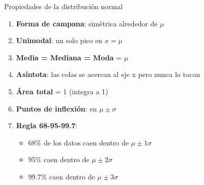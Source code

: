 \documentclass[aspectratio=169, 11pt]{beamer}
\begin{document}
\begin{frame}{Propiedades de la distribución normal}
\begin{enumerate}
\item \textbf{Forma de campana}: simétrica alrededor de $\mu$
\item \textbf{Unimodal}: un solo pico en $x = \mu$
\item \textbf{Media = Mediana = Moda} = $\mu$
\item \textbf{Asíntota}: las colas se acercan al eje x pero nunca lo tocan
\item \textbf{Área total} = 1 (integra a 1)
\item \textbf{Puntos de inflexión}: en $\mu \pm \sigma$
\item \textbf{Regla 68-95-99.7}:
  \begin{itemize}
  \item 68\% de los datos caen dentro de $\mu \pm 1\sigma$
  \item 95\% caen dentro de $\mu \pm 2\sigma$
  \item 99.7\% caen dentro de $\mu \pm 3\sigma$
  \end{itemize}
\end{enumerate}

\vspace{0.5em}
\begin{center}
\end{center}
\end{frame}
\end{document}
